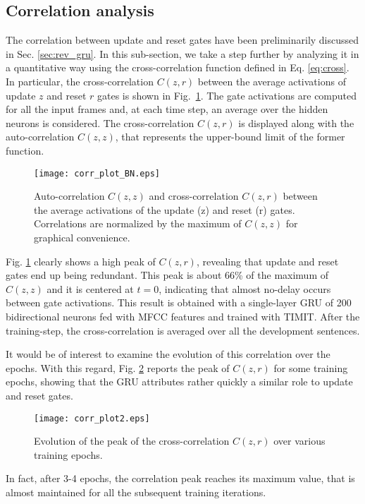 \documentclass[journal]{IEEEtran}
\begin{document}
\subsection{Correlation analysis} \label{sec:corr}
The correlation between update and reset gates have been preliminarily discussed in Sec. \ref{sec:rev_gru}. In this sub-section, we take a step further by analyzing it in a quantitative way using the cross-correlation function defined in Eq. \ref{eq:cross}.
In particular, the cross-correlation $C(z,r)$ between the average activations of update $z$ and reset $r$ gates is shown in Fig.~\ref{fig:corr}.
The gate activations are computed for all the input frames and, at each time step, an average over the hidden neurons is considered.
The cross-correlation $C(z,r)$ is displayed along with the auto-correlation $C(z,z)$, that represents the upper-bound limit of the former function.  

\begin{figure}[t]
\centering
  \texttt{[image: corr\_plot\_BN.eps]}
\caption{Auto-correlation $C(z,z)$ and cross-correlation $C(z,r)$ between the average activations of the update (z) and reset (r) gates. Correlations are normalized by the maximum of $C(z,z)$ for graphical convenience.}\label{fig:corr}
\end{figure}
Fig. \ref{fig:corr} clearly shows a high peak of $C(z,r)$, revealing that update and reset gates end up being  redundant. This peak is about 66\% of the maximum of $C(z,z)$ and it is centered at $t=0$, indicating that almost no-delay occurs between gate activations.  This result is obtained with a single-layer GRU of 200 bidirectional neurons fed with MFCC features and trained with TIMIT. After the training-step, the cross-correlation is averaged over all the development sentences.


It would be of interest to examine the evolution of this correlation over the epochs. With this regard, Fig. \ref{fig:corr2} reports the peak of $C(z,r)$ for some training epochs, showing that the GRU attributes rather quickly a similar role to update and reset gates. 
\begin{figure}[t]
\centering
  \texttt{[image: corr\_plot2.eps]}
\caption{Evolution of the  peak of the cross-correlation $C(z,r)$ over various training epochs.}\label{fig:corr2}
\end{figure}
In fact, after 3-4 epochs, the correlation peak reaches its maximum value, that is almost maintained for all the subsequent training iterations.   
\end{document}
